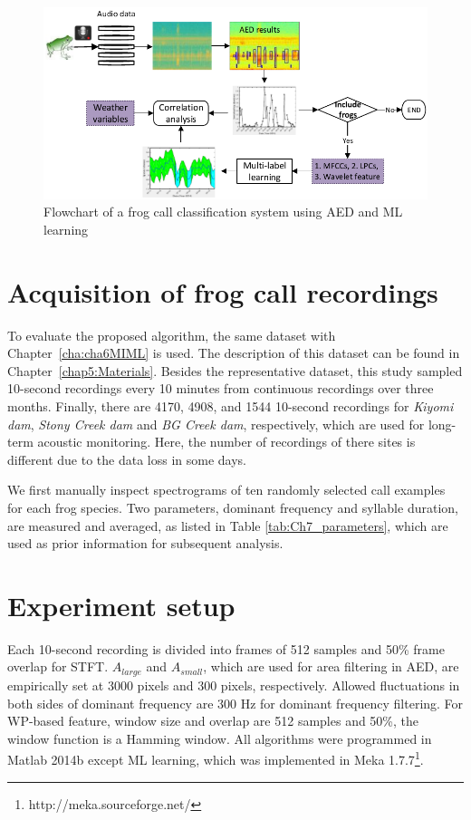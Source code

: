 \begin{figure}[htb!]
\centering
\includegraphics[width=\textwidth]{image/Ch7/flowchart.pdf}
\caption{Flowchart of a frog call classification system using AED and ML learning}
\label{fig:Ch7_flowchart}
\end{figure}


\section{Acquisition of frog call recordings}

To evaluate the proposed algorithm, the same dataset with Chapter~\ref{cha:cha6MIML} is used. The description of this dataset can be found in Chapter~\ref{chap5:Materials}. Besides the representative dataset, this study  sampled 10-second recordings every 10 minutes from continuous recordings over three months. Finally, there are 4170, 4908, and 1544 10-second recordings for \textit{Kiyomi dam}, \textit{Stony Creek dam} and \textit{BG Creek dam}, respectively, which are used for long-term acoustic monitoring. Here, the number of recordings of there sites is different due to the data loss in some days.




We first manually inspect spectrograms of ten randomly selected call examples for each frog species. Two parameters, dominant frequency and syllable duration, are measured and averaged, as listed in Table \ref{tab:Ch7_parameters}, which are used as prior information for subsequent analysis.



\section{Experiment setup}
Each 10-second recording is divided into frames of 512 samples and 50\% frame overlap for STFT. $A_{large}$ and $A_{small}$, which are used for area filtering in AED, are empirically set at 3000 pixels and 300 pixels, respectively. Allowed fluctuations in both sides of dominant frequency are 300 Hz for dominant frequency filtering. For WP-based feature, window size and overlap are 512 samples and 50\%, the window function is a Hamming window. All algorithms were programmed in Matlab 2014b except ML learning, which was implemented in Meka 1.7.7\footnote[4]{http://meka.sourceforge.net/}. 




